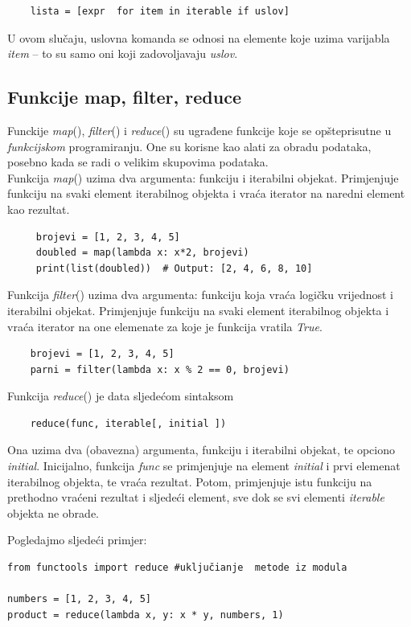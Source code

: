 \begin{verbatim}
	lista = [expr  for item in iterable if uslov]
\end{verbatim}
U ovom slučaju, uslovna komanda se odnosi na elemente koje uzima varijabla \textit{item} -- to su samo oni koji zadovoljavaju \textit{uslov}. 

\subsection{Funkcije map, filter, reduce}

Funckije \textit{map}(), \textit{filter}() i \textit{reduce}() su ugrađene funkcije koje se opštepri\-sutne u \textit{funkcijskom} programiranju. One su korisne kao alati za obradu podataka, posebno kada se radi o velikim skupovima podataka.\\

Funkcija \textit{map}() uzima dva argumenta: funkciju i iterabilni objekat. Primjenjuje funkciju  na svaki element iterabilnog objekta i vraća iterator na naredni element kao rezultat. 

\begin{verbatim}
     brojevi = [1, 2, 3, 4, 5]
     doubled = map(lambda x: x*2, brojevi)
     print(list(doubled))  # Output: [2, 4, 6, 8, 10]
\end{verbatim}


Funkcija \textit{filter}() uzima dva argumenta: funkciju koja vraća logičku vrijednost i iterabi\-lni objekat. Primjenjuje funkciju na svaki element iterabilnog objekta i vraća iterator na one elemenate za koje je funkcija vratila \emph{True}. 
\begin{verbatim}
	brojevi = [1, 2, 3, 4, 5]
	parni = filter(lambda x: x % 2 == 0, brojevi)
\end{verbatim}

Funkcija  \textit{reduce}() je data sljedećom sintaksom
\begin{verbatim}
	reduce(func, iterable[, initial ])
\end{verbatim}

Ona uzima dva (obavezna) argumenta,  funkciju i iterabilni objekat, te opciono \textit{initial}. Inicijalno, funkcija \textit{func} se primjenjuje na element \emph{initial} i prvi elemenat iterabilnog objekta, te vraća rezultat. Potom,    primjenjuje istu funkciju na prethodno vraćeni rezultat i sljedeći ele\-ment, sve dok se svi elementi \emph{iterable} objekta ne obrade. 

Pogledajmo sljedeći primjer: 
\begin{verbatim}
from functools import reduce #uključianje  metode iz modula 

numbers = [1, 2, 3, 4, 5]
product = reduce(lambda x, y: x * y, numbers, 1)
\end{verbatim}

